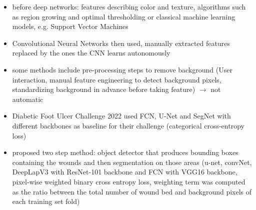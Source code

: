 \begin{itemize}
	\item before deep networks: features describing color and texture, algorithms such as region growing and optimal thresholding or classical machine learning models, e.g. Support Vector Machines \cite{Scebba2022}
	\item Convolutional Neural Networks then used, manually extracted features replaced by the ones the CNN learns autonomously \cite{Scebba2022}
	\item some methods include pre-processing steps to remove background (User interaction, manual feature engineering to detect background pixels, standardizing background in advance before taking feature) $\rightarrow$ not automatic
	\item Diabetic Foot Ulcer Challenge 2022 used FCN, U-Net and SegNet with different backbones as baseline for their challenge (categorical cross-entropy loss) \cite{DFUC2022}
	\item \citeauthor{Scebba2022} proposed two step method: object detector that produces bounding boxes containing the wounds and then segmentation on those areas (u-net, convNet, DeepLapV3 with ResNet-101 backbone and FCN with VGG16 backbone, pixel-wise weighted binary cross entropy loss, weighting term was computed as the ratio between the total number of wound bed and background pixels of each training set fold)
\end{itemize}



